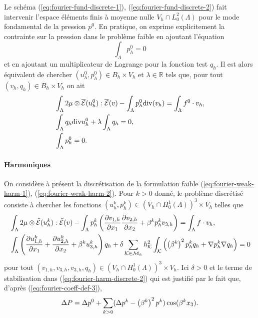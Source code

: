 Le schéma (\ref{eq:fourier-fund-discrete-1}),
(\ref{eq:fourier-fund-discrete-2}) fait intervenir l'espace
éléments finis à moyenne nulle $V_h \cap L^2_0(\Lambda)$ pour le mode
fondamental de la pression $p^0$. En pratique, on exprime
explicitement la contrainte sur la pression dans le problème faible
en ajoutant l'équation
\begin{equation}
\int_\Lambda p^0_h = 0
\end{equation}
et en ajoutant un multiplicateur de Lagrange pour la fonction test $q_h$. Il est alors équivalent
de chercher $(u^0_h, p^0_h)\in B_h\times V_h$ et
$\lambda\in\mathbb R$ tels que, pour tout $(v_h, q_h)\in
B_h\times V_h$ on ait
\begin{align}
  &\int_\Lambda
  2\mu\otimes\overline{\mathcal E}(u^0_h):\overline{\mathcal E}(v)
  -\int_\Lambda p^0_h\mathrm{div}(v_h) = \int_\Lambda f^0\cdot v_h, \label{eq:fourier-fund-discrete-1-prat}\\
  & \int_\Lambda q_h\mathrm{div} u^0_h + \lambda \int_\Lambda q_h =
  0,\label{eq:fourier-fund-discrete-2-prat}\\
  & \int_\Lambda p_h^0 = 0.\label{eq:fourier-fund-discrete-3-prat}
\end{align}

\paragraph{Harmoniques}
On considère à présent la discrétisation de la formulation
faible (\ref{eq:fourier-weak-harm-1}),
(\ref{eq:fourier-weak-harm-2}). Pour $k > 0$ donné, le problème
discrétisé consiste à chercher les fonctions $(u^k_h, p^k_h) \in
(V_h\cap H_0^1(\Lambda))^3\times V_h$ telles que
\begin{align}
  &\int_\Lambda 2\mu\otimes
  \tilde{\mathcal E}(u^k_h):\tilde{\mathcal E}(v) - \int_\Lambda
  p_h^k\left( \frac{\partial v_{1,h}}{\partial x_1}
    \frac{\partial v_{2,h}}{\partial x_2} +\beta^k p^k_h v_{3,h} \right) =
  \int_\Lambda f\cdot v_h,\label{eq:fourier-harm-discrete-1}\\
  &\int_\Lambda \left( \frac{\partial u^k_{1,h}}{\partial x_1} +
    \frac{\partial u^k_{2,h}}{\partial x_2} + \beta^k u^k_{3,h} \right)q_h +
  \delta \sum_{{\mathcal K}\in\mathcal M_h} h_{\mathcal K}^2
  \int_{\mathcal K}\left( \left( \beta^k \right)^2 p^k_h q_h + \nabla p_h^k \nabla
    q_h \right) = 0\label{eq:fourier-harm-discrete-2}
\end{align}
pour tout $(v_{1,h}, v_{3,h}, v_{3,h}, q_h) \in (V_h\cap
H_0^1(\Lambda))^3\times V_h$. Ici $\delta > 0$ et le terme de
stabilisation dans (\ref{eq:fourier-harm-discrete-2}) qui est justifié
par le fait que, d'après (\ref{eq:fourier-coeff-def-3}),
\begin{equation}
  \Delta P = \Delta p^0 + \sum_{k > 0} (\Delta p^k -
  \left( \beta^k \right)^2 p^k)\cos(\beta^k x_3).
\end{equation}

